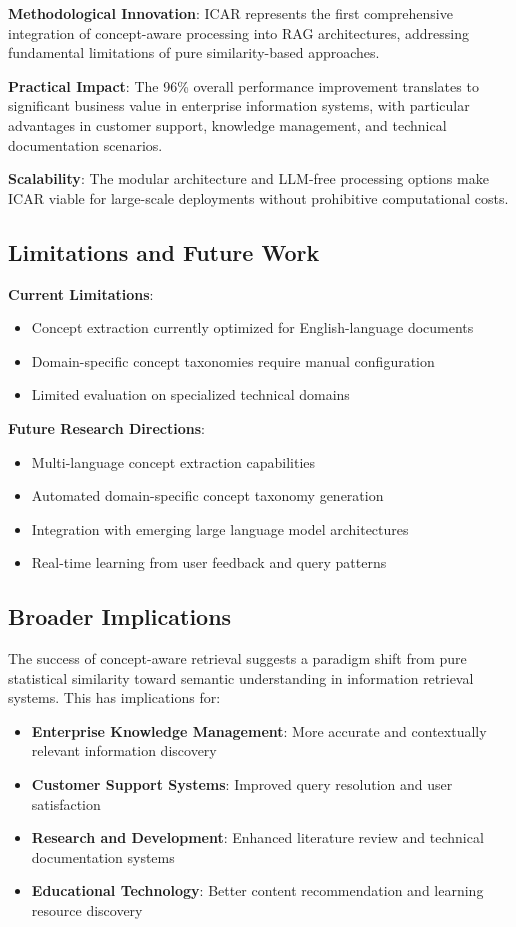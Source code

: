 \documentclass[11pt]{article}
\begin{document}
\textbf{Methodological Innovation}: ICAR represents the first comprehensive integration of concept-aware processing into RAG architectures, addressing fundamental limitations of pure similarity-based approaches.

\textbf{Practical Impact}: The 96\% overall performance improvement translates to significant business value in enterprise information systems, with particular advantages in customer support, knowledge management, and technical documentation scenarios.

\textbf{Scalability}: The modular architecture and LLM-free processing options make ICAR viable for large-scale deployments without prohibitive computational costs.

\subsection{Limitations and Future Work}

\textbf{Current Limitations}:
\begin{itemize}
\item Concept extraction currently optimized for English-language documents
\item Domain-specific concept taxonomies require manual configuration
\item Limited evaluation on specialized technical domains
\end{itemize}

\textbf{Future Research Directions}:
\begin{itemize}
\item Multi-language concept extraction capabilities
\item Automated domain-specific concept taxonomy generation
\item Integration with emerging large language model architectures
\item Real-time learning from user feedback and query patterns
\end{itemize}

\subsection{Broader Implications}

The success of concept-aware retrieval suggests a paradigm shift from pure statistical similarity toward semantic understanding in information retrieval systems. This has implications for:

\begin{itemize}
\item \textbf{Enterprise Knowledge Management}: More accurate and contextually relevant information discovery
\item \textbf{Customer Support Systems}: Improved query resolution and user satisfaction
\item \textbf{Research and Development}: Enhanced literature review and technical documentation systems
\item \textbf{Educational Technology}: Better content recommendation and learning resource discovery
\end{itemize}
\end{document}
